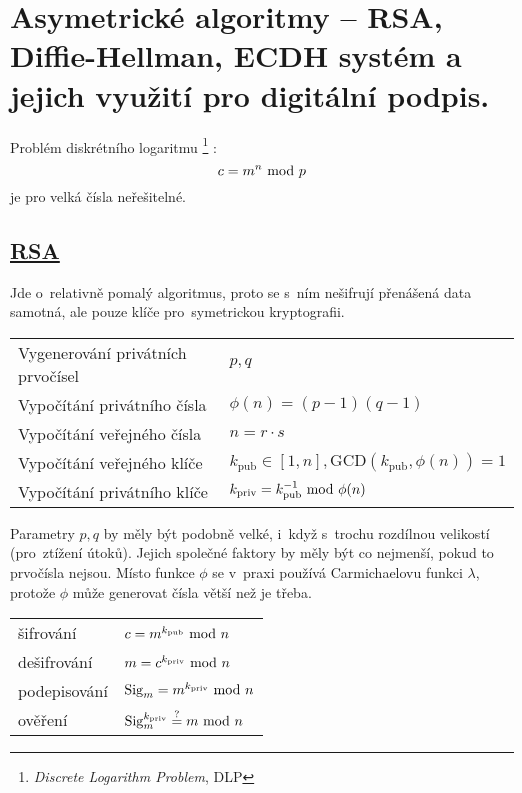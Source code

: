 \clearpage
\section{Asymetrické algoritmy -- RSA, Diffie-Hellman, ECDH systém a jejich využití pro digitální podpis.}

Problém diskrétního logaritmu%
\footnote{\emph{Discrete Logarithm Problem}, DLP}%
: $$c = m^n \ \mathrm{mod}\ p$$ je pro velká čísla neřešitelné.

\subsection[RSA]{\href{https://en.wikipedia.org/wiki/RSA_(cryptosystem)}{RSA}}

Jde o~relativně pomalý algoritmus, proto se s~ním nešifrují přenášená data samotná, ale pouze klíče pro~symetrickou kryptografii.

\begin{table}[ht]
\begin{tabular}{ll}
Vygenerování privátních prvočísel & $p, q$ \\
Vypočítání privátního čísla & $\phi(n) = (p-1)(q-1)$ \\
Vypočítání veřejného čísla & $n = r \cdot s$ \\
Vypočítání veřejného klíče & $k_{\mathrm{pub}} \in [1, n], \mathrm{GCD}(k_{\mathrm{pub}}, \phi(n)) = 1$ \\
Vypočítání privátního klíče & $k_{\mathrm{priv}} = k_{\mathrm{pub}}^{-1} \ \mathrm{mod}\ \phi(n)$ \\
\end{tabular}
\end{table}

Parametry $p, q$ by měly být podobně velké, i~když s~trochu rozdílnou velikostí (pro~ztížení útoků). Jejich společné faktory by měly být co nejmenší, pokud to prvočísla nejsou. Místo funkce $\phi$ se v~praxi používá Carmichaelovu funkci $\lambda$, protože $\phi$ může generovat čísla větší než je třeba.

\begin{table}[ht]
\begin{tabular}{ll}
šifrování & $c = m^{k_{\mathrm{pub}}} \ \mathrm{mod}\ n$ \\
dešifrování & $m = c^{k_{\mathrm{priv}}} \ \mathrm{mod}\ n$ \\
podepisování & $\mathrm{Sig}_m = m^{k_{\mathrm{priv}}} \ \mathrm{mod}\ n$ \\
ověření & $\mathrm{Sig}_m^{k_{\mathrm{priv}}} \stackrel{?}{=} m \ \mathrm{mod}\ n$ \\
\end{tabular}
\end{table}

